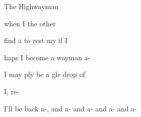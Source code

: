 \begin{SBSong}{The Highwayman}{}{}
\begin{SBVerse}
     when I  the other 

     find a  to rest my  if I 

    haps I  become a wayman a-

     I may ply be a gle drop of 

     I,  re-

     I'll be back a-, and a- and a- and a- and a-
  \end{SBVerse}
\end{SBSong}
